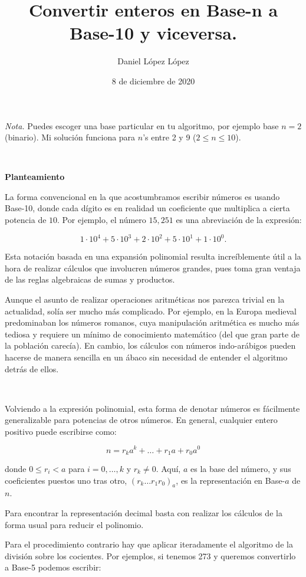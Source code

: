 \documentclass{article}
\title{\textbf{Convertir enteros en Base-n a Base-10 y viceversa.}}
\author{Daniel López López}
\date{8 de diciembre de 2020}
\begin{document}
\maketitle

\emph{Nota.} Puedes escoger una base particular en tu algoritmo, por ejemplo base $n=2$ (binario). Mi solución funciona para $n$'s entre 2 y 9 ($2\leq n \leq 10$). 

\

\textbf{Planteamiento}

La forma convencional en la que acostumbramos escribir números es usando Base-10, donde cada dígito es en realidad un coeficiente que multiplica a cierta potencia de $10$. Por ejemplo, el número $15,251$ es una abreviación de la expresión:

\[ 1\cdot 10^4 + 5\cdot 10^3 + 2\cdot 10^2 + 5\cdot 10^1 + 1\cdot 10^0.\]

Esta notación basada en una expansión polinomial resulta increíblemente útil a la hora de realizar cálculos que involucren números grandes, pues toma gran ventaja de las reglas algebraicas de sumas y productos. 

Aunque el asunto de realizar operaciones aritméticas nos parezca trivial en la actualidad, solía ser mucho más complicado. Por ejemplo, en la Europa medieval predominaban los números romanos, cuya manipulación aritmética es mucho más tediosa  y requiere un mínimo de conocimiento matemático (del que gran parte de la población carecía).  En cambio, los cálculos con números indo-arábigos pueden hacerse de manera sencilla en un ábaco sin necesidad de entender el algoritmo detrás de ellos.

\

Volviendo a la expresión polinomial, esta forma de denotar números es fácilmente generalizable para potencias de otros números. En general, cualquier entero positivo puede escribirse como:

\[ n=r_ka^k + \ldots + r_1a+r_0a^0 \]

donde $0\leq r_i<a$ para $i=0,\ldots , k$ y $r_k\neq 0$. Aquí, $a$ es la base del número, y sus coeficientes puestos uno tras otro, $(r_k\ldots r_1r_0)_a$, es la representación en Base-$a$ de $n$.

Para encontrar la representación decimal basta con realizar los cálculos de la forma usual para reducir el polinomio.

\vspace{3em}

Para el procedimiento contrario hay que aplicar iteradamente el algoritmo de la división sobre los cocientes. Por ejemplos, si tenemos 273 y queremos convertirlo a Base-5 podemos escribir:
\end{document}
